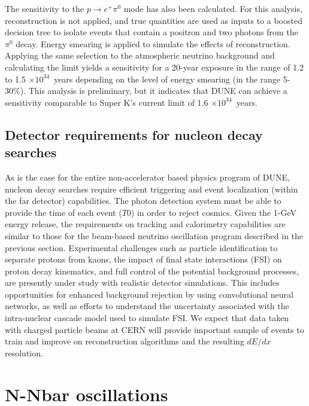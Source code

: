 The sensitivity to the $p \rightarrow e^{+} \pi^0$ mode has also been calculated. For this analysis, reconstruction is not applied, and true quantities are used as inputs to a boosted decision tree to isolate events that contain a positron and two photons from the $\pi^0$ decay.  Energy smearing is applied to simulate the effects of reconstruction.  Applying the same selection to the atmospheric neutrino background and calculating the limit yields a sensitivity for a 20-year exposure in the range of 1.2 to 1.5 $\times 10^{34}$~years depending on the level of energy smearing (in the range 5-30\%).  This analysis is preliminary, but it indicates that DUNE can achieve a sensitivity comparable to Super K's current limit of 1.6 $\times 10^{34}$~years.

\subsection{Detector requirements for nucleon decay searches}
\label{subsec:nonaccel-ndk-requirements}

As is the case for the entire non-accelerator based physics program of DUNE, nucleon decay 
searches require efficient triggering and event localization (within the far detector) 
capabilities. The photon detection system must be able to provide the time of each event ($T0$) in order to reject cosmics. Given the 1-GeV energy release, the requirements on tracking and calorimetry 
capabilities are similar to those for the beam-based neutrino oscillation program described 
in the previous section.  
Experimental challenges such as particle identification to separate protons from kaons, 
the impact of final state interactions (FSI) on proton decay kinematics, and full control 
of the potential background processes, are presently under study with realistic detector simulations.
This includes opportunities for enhanced background rejection 
by using convolutional neural networks, as well as efforts to understand the 
uncertainty associated with the intra-nuclear cascade model used to simulate FSI. 
We expect that  data taken with charged particle beams at CERN will 
provide important sample of events to train and improve on reconstruction algorithms 
and the resulting $dE/dx$ resolution.


\section{N-Nbar oscillations}
\label{sec:nonaccel-nnbar}

